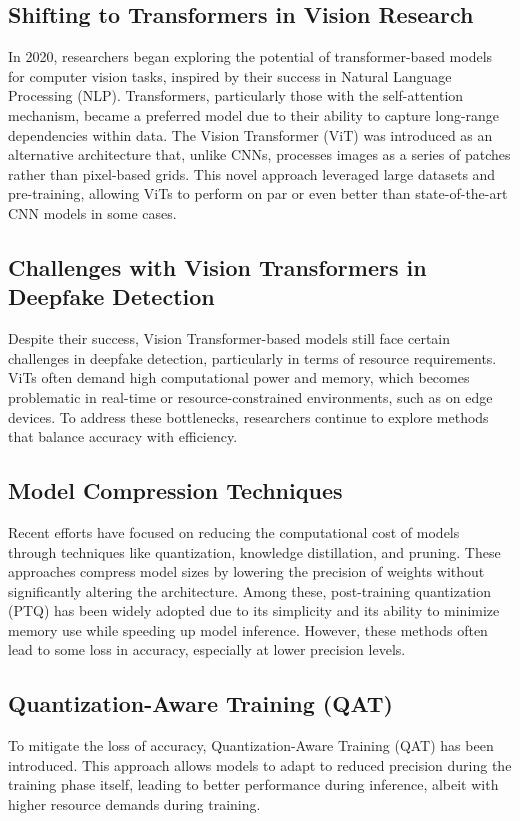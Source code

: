 \documentclass[conference]{IEEEtran}
\begin{document}
		\subsection{Shifting to Transformers in Vision Research}
		In 2020, researchers began exploring the potential of transformer-based models for computer vision tasks, inspired by their success in Natural Language Processing (NLP). Transformers, particularly those with the self-attention mechanism, became a preferred model due to their ability to capture long-range dependencies within data. The Vision Transformer (ViT) was introduced as an alternative architecture that, unlike CNNs, processes images as a series of patches rather than pixel-based grids. This novel approach leveraged large datasets and pre-training, allowing ViTs to perform on par or even better than state-of-the-art CNN models in some cases.
		
		\subsection{Challenges with Vision Transformers in Deepfake Detection}
		Despite their success, Vision Transformer-based models still face certain challenges in deepfake detection, particularly in terms of resource requirements. ViTs often demand high computational power and memory, which becomes problematic in real-time or resource-constrained environments, such as on edge devices. To address these bottlenecks, researchers continue to explore methods that balance accuracy with efficiency.
		
		\subsection{Model Compression Techniques}
		Recent efforts have focused on reducing the computational cost of models through techniques like quantization, knowledge distillation, and pruning. These approaches compress model sizes by lowering the precision of weights without significantly altering the architecture. Among these, post-training quantization (PTQ) has been widely adopted due to its simplicity and its ability to minimize memory use while speeding up model inference. However, these methods often lead to some loss in accuracy, especially at lower precision levels.
		
		\subsection{Quantization-Aware Training (QAT)}
		To mitigate the loss of accuracy, Quantization-Aware Training (QAT) has been introduced. This approach allows models to adapt to reduced precision during the training phase itself, leading to better performance during inference, albeit with higher resource demands during training.
		
\end{document}
